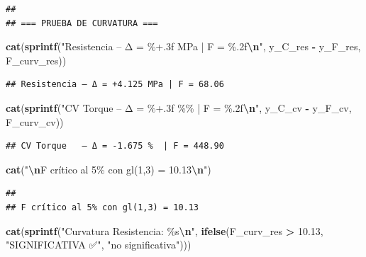 \documentclass[
]{article}
\newenvironment{Shaded}{\begin{snugshade}}{\end{snugshade}}
\newcommand{\FloatTok}[1]{\textcolor[rgb]{0.00,0.00,0.81}{#1}}
\newcommand{\FunctionTok}[1]{\textcolor[rgb]{0.13,0.29,0.53}{\textbf{#1}}}
\newcommand{\NormalTok}[1]{#1}
\newcommand{\SpecialCharTok}[1]{\textcolor[rgb]{0.81,0.36,0.00}{\textbf{#1}}}
\newcommand{\StringTok}[1]{\textcolor[rgb]{0.31,0.60,0.02}{#1}}
\begin{document}
\begin{verbatim}
## 
## === PRUEBA DE CURVATURA ===
\end{verbatim}

\begin{Shaded}
\begin{Highlighting}[]
\FunctionTok{cat}\NormalTok{(}\FunctionTok{sprintf}\NormalTok{(}\StringTok{"Resistencia – Δ = \%+.3f MPa | F = \%.2f}\SpecialCharTok{\textbackslash{}n}\StringTok{"}\NormalTok{,}
\NormalTok{            y\_C\_res }\SpecialCharTok{{-}}\NormalTok{ y\_F\_res, F\_curv\_res))}
\end{Highlighting}
\end{Shaded}

\begin{verbatim}
## Resistencia – Δ = +4.125 MPa | F = 68.06
\end{verbatim}

\begin{Shaded}
\begin{Highlighting}[]
\FunctionTok{cat}\NormalTok{(}\FunctionTok{sprintf}\NormalTok{(}\StringTok{"CV Torque   – Δ = \%+.3f \%\%  | F = \%.2f}\SpecialCharTok{\textbackslash{}n}\StringTok{"}\NormalTok{,}
\NormalTok{            y\_C\_cv }\SpecialCharTok{{-}}\NormalTok{ y\_F\_cv, F\_curv\_cv))}
\end{Highlighting}
\end{Shaded}

\begin{verbatim}
## CV Torque   – Δ = -1.675 %  | F = 448.90
\end{verbatim}

\begin{Shaded}
\begin{Highlighting}[]
\FunctionTok{cat}\NormalTok{(}\StringTok{"}\SpecialCharTok{\textbackslash{}n}\StringTok{F crítico al 5\% con gl(1,3) = 10.13}\SpecialCharTok{\textbackslash{}n}\StringTok{"}\NormalTok{)}
\end{Highlighting}
\end{Shaded}

\begin{verbatim}
## 
## F crítico al 5% con gl(1,3) = 10.13
\end{verbatim}

\begin{Shaded}
\begin{Highlighting}[]
\FunctionTok{cat}\NormalTok{(}\FunctionTok{sprintf}\NormalTok{(}\StringTok{"Curvatura Resistencia: \%s}\SpecialCharTok{\textbackslash{}n}\StringTok{"}\NormalTok{,}
            \FunctionTok{ifelse}\NormalTok{(F\_curv\_res }\SpecialCharTok{\textgreater{}} \FloatTok{10.13}\NormalTok{, }\StringTok{"SIGNIFICATIVA ✅"}\NormalTok{, }\StringTok{"no significativa"}\NormalTok{)))}
\end{Highlighting}
\end{Shaded}
\end{document}
